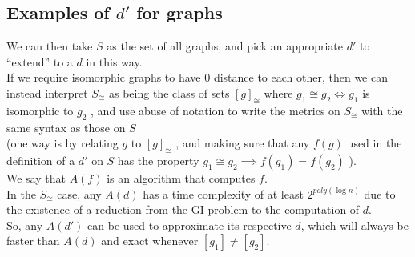 \newpage	
\subsection{Examples of $d'$ for graphs}
	We can then take $S$ as the set of all graphs, and pick an appropriate $d'$ to
	“extend” to a $d$ in this way. \\
	If we require isomorphic graphs to have 0 distance to each other, then we can
	instead interpret $S_{\cong}$ as being the class of sets $[g]_{\cong}$ where $g_1 \cong g_2 \iff g_1$ is
	isomorphic to $g_2$ , and use abuse of notation to write the metrics on $S_{\cong}$ with
	the same syntax as those on $S$ \\
	(one way is by relating $g$ to $[g]_{\cong}$ , and making sure
	that any $f(g)$ used in the definition of a $d'$ on $S$ has the property $g_1 \cong g_2 \implies f (g_1)=f (g_2)$ ). \\
	
	We say that $A(f)$ is an algorithm that computes $f$. \\
	In the $S_{\cong}$ case, any $A(d)$ has a time complexity of at least $2^{poly(\log n)}$ \cite{DBLP:journals/corr/Babai15} due to the existence of a reduction from the GI problem to the computation of $d$. \\
	So, any $A(d')$ can be used to approximate its respective $d$, which will always be faster
	than $A(d)$ and exact whenever $[g_1]\neq[g_2]$.\\
	
